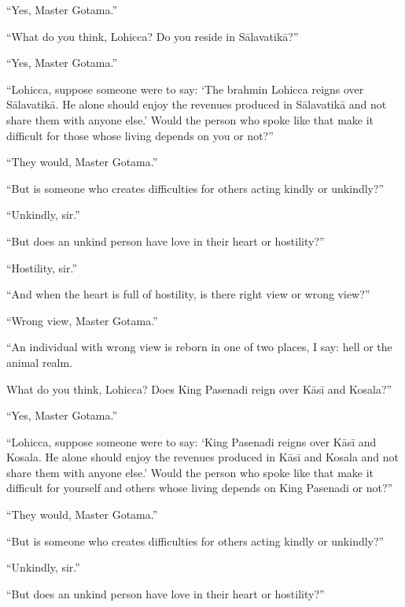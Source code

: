 \documentclass[12pt,openany]{book}%
\begin{document}
“Yes, Master Gotama.” 

“What do you think, Lohicca? Do you reside in \textsanskrit{Sālavatikā}?” 

“Yes, Master Gotama.” 

“Lohicca, suppose someone were to say: ‘The brahmin Lohicca reigns over \textsanskrit{Sālavatikā}. He alone should enjoy the revenues produced in \textsanskrit{Sālavatikā} and not share them with anyone else.’ Would the person who spoke like that make it difficult for those whose living depends on you or not?” 

“They would, Master Gotama.” 

“But is someone who creates difficulties for others acting kindly or unkindly?” 

“Unkindly, sir.” 

“But does an unkind person have love in their heart or hostility?” 

“Hostility, sir.” 

“And when the heart is full of hostility, is there right view or wrong view?” 

“Wrong view, Master Gotama.” 

“An individual with wrong view is reborn in one of two places, I say: hell or the animal realm. 

What do you think, Lohicca? Does King Pasenadi reign over \textsanskrit{Kāsī} and Kosala?” 

“Yes, Master Gotama.” 

“Lohicca, suppose someone were to say: ‘King Pasenadi reigns over \textsanskrit{Kāsī} and Kosala. He alone should enjoy the revenues produced in \textsanskrit{Kāsī} and Kosala and not share them with anyone else.’ Would the person who spoke like that make it difficult for yourself and others whose living depends on King Pasenadi or not?” 

“They would, Master Gotama.” 

“But is someone who creates difficulties for others acting kindly or unkindly?” 

“Unkindly, sir.” 

“But does an unkind person have love in their heart or hostility?” 
\end{document}
